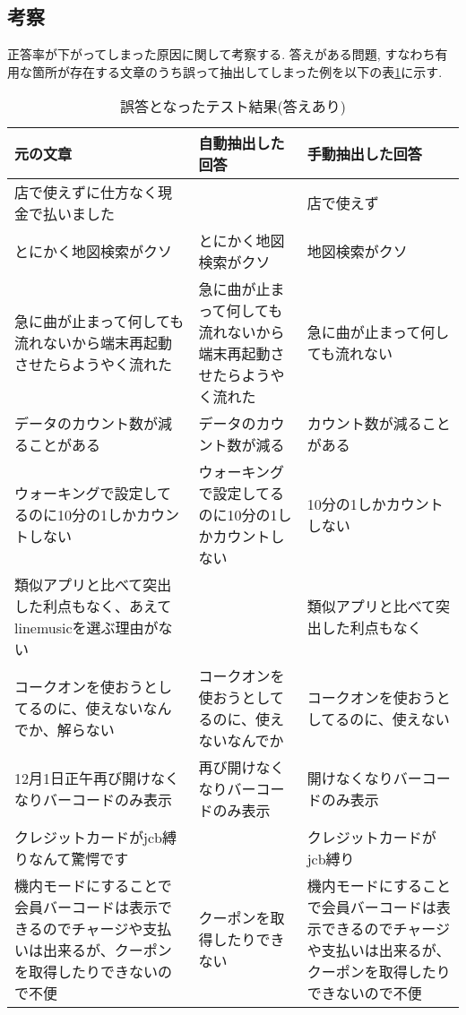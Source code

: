 \subsection{考察}
正答率が下がってしまった原因に関して考察する. 
答えがある問題, すなわち有用な箇所が存在する文章のうち誤って抽出してしまった例を以下の表\ref{tb:mistake}に示す.

\begin{table}[htbp]
  \caption{誤答となったテスト結果(答えあり)}
  \label{tb:mistake}
  \begin{center}
  \begin{tabularx}{\linewidth}{|X|X|X|}
    \hline
    元の文章&自動抽出した回答&手動抽出した回答\\\hline\hline
    店で使えずに仕方なく現金で払いました&&店で使えず\\\hline
    とにかく地図検索がクソ&とにかく地図検索がクソ&地図検索がクソ\\\hline
    急に曲が止まって何しても流れないから端末再起動させたらようやく流れた&急に曲が止まって何しても流れないから端末再起動させたらようやく流れた&急に曲が止まって何しても流れない\\\hline
    データのカウント数が減ることがある&データのカウント数が減る&カウント数が減ることがある\\\hline
    ウォーキングで設定してるのに10分の1しかカウントしない&ウォーキングで設定してるのに10分の1しかカウントしない&10分の1しかカウントしない\\\hline
    類似アプリと比べて突出した利点もなく、あえてlinemusicを選ぶ理由がない&&類似アプリと比べて突出した利点もなく\\\hline
    コークオンを使おうとしてるのに、使えないなんでか、解らない&コークオンを使おうとしてるのに、使えないなんでか&コークオンを使おうとしてるのに、使えない\\\hline
    12月1日正午再び開けなくなりバーコードのみ表示&再び開けなくなりバーコードのみ表示&開けなくなりバーコードのみ表示\\\hline
    クレジットカードがjcb縛りなんて驚愕です&&クレジットカードがjcb縛り\\\hline
    機内モードにすることで会員バーコードは表示できるのでチャージや支払いは出来るが、クーポンを取得したりできないので不便&クーポンを取得したりできない&機内モードにすることで会員バーコードは表示できるのでチャージや支払いは出来るが、クーポンを取得したりできないので不便\\\hline
  \end{tabularx}\end{center}
\end{table}

